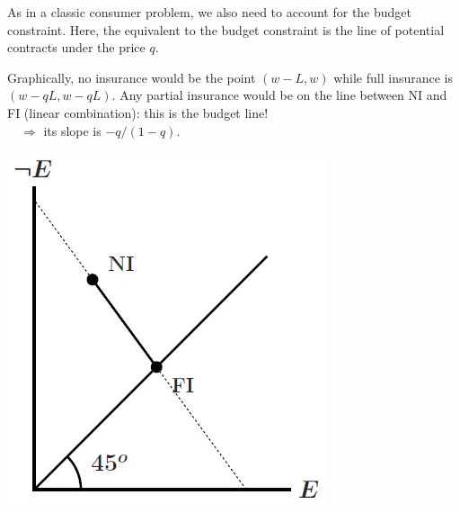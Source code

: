 \documentclass[12pt]{report}
\begin{document}
As in a classic consumer problem, we also need to account for the budget constraint. Here, the equivalent to the budget constraint is the line of potential contracts under the price $q$.

\begin{minipage}{0.69\textwidth}
Graphically, no insurance would be the point $(w -L , w)$ while full insurance is $(w- qL, w-qL)$. Any partial insurance would be on the line between NI and FI (linear combination): this is the budget line! \\
$ \quad \Rightarrow$ its slope is $-q/(1-q)$.
\end{minipage}
\begin{minipage}{0.29\textwidth}
\centering
\includegraphics[scale=0.35]{images/budgline}
\end{minipage} \hfill
\end{document}
